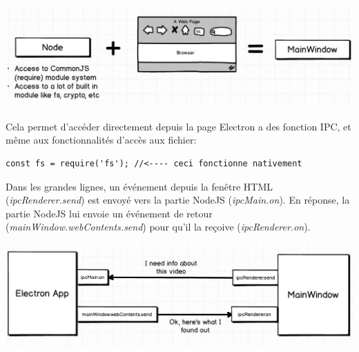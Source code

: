 \documentclass[12pt,oneside]{scrbook}
\begin{document}
\begin{center}
\includegraphics[width=\textwidth]{./img/electron_ajout.jpg}
\label{fig1}
\end{center}

Cela permet d'accéder directement depuis la page Electron a des fonction IPC, et même aux fonctionnalités d'accès aux fichier:
\begin{verbatim}
const fs = require('fs'); //<---- ceci fonctionne nativement
\end{verbatim}

Dans les grandes lignes, un événement depuis la fenêtre HTML (\textit{ipcRenderer.send}) est envoyé vers la partie NodeJS  (\textit{ipcMain.on}). En réponse, la partie NodeJS lui envoie un événement de retour (\textit{mainWindow.webContents.send}) pour qu'il la reçoive (\textit{ipcRenderer.on}).
\begin{center}
\includegraphics[width=\textwidth]{./img/ipc_principe.jpg}
\label{fig1}
\end{center}
\end{document}
